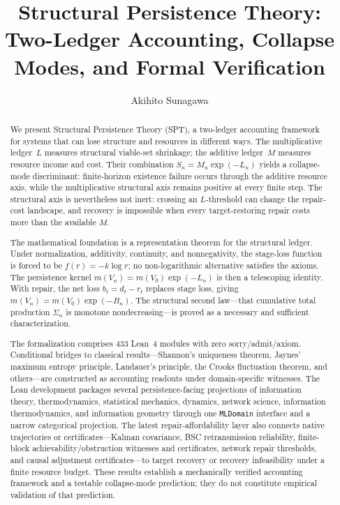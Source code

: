 \documentclass[11pt,a4paper]{article}
\title{Structural Persistence Theory:\\Two-Ledger Accounting, Collapse Modes, and Formal Verification}
\author{Akihito Sunagawa}
\date{}
\begin{document}
\maketitle

\begin{abstract}
We present Structural Persistence Theory (SPT), a two-ledger accounting framework for systems that can lose structure and resources in different ways. The multiplicative ledger~$L$ measures structural viable-set shrinkage; the additive ledger~$M$ measures resource income and cost. Their combination $S_n=M_n\exp(-L_n)$ yields a collapse-mode discriminant: finite-horizon existence failure occurs through the additive resource axis, while the multiplicative structural axis remains positive at every finite step. The structural axis is nevertheless not inert: crossing an $L$-threshold can change the repair-cost landscape, and recovery is impossible when every target-restoring repair costs more than the available $M$.

The mathematical foundation is a representation theorem for the structural ledger. Under normalization, additivity, continuity, and nonnegativity, the stage-loss function is forced to be $f(r)=-k\log r$; no non-logarithmic alternative satisfies the axioms. The persistence kernel $m(V_n)=m(V_0)\exp(-L_n)$ is then a telescoping identity. With repair, the net loss $b_t=d_t-r_t$ replaces stage loss, giving $m(V_n)=m(V_0)\exp(-B_n)$. The structural second law---that cumulative total production $\Sigma_n$ is monotone nondecreasing---is proved as a necessary and sufficient characterization.

The formalization comprises 433 Lean~4 modules with zero sorry/admit/axiom. Conditional bridges to classical results---Shannon's uniqueness theorem, Jaynes' maximum entropy principle, Landauer's principle, the Crooks fluctuation theorem, and others---are constructed as accounting readouts under domain-specific witnesses. The Lean development packages several persistence-facing projections of information theory, thermodynamics, statistical mechanics, dynamics, network science, information thermodynamics, and information geometry through one \texttt{MLDomain} interface and a narrow categorical projection. The latest repair-affordability layer also connects native trajectories or certificates---Kalman covariance, BSC retransmission reliability, finite-block achievability/obstruction witnesses and certificates, network repair thresholds, and causal adjustment certificates---to target recovery or recovery infeasibility under a finite resource budget. These results establish a mechanically verified accounting framework and a testable collapse-mode prediction; they do not constitute empirical validation of that prediction.
\end{abstract}
\end{document}
